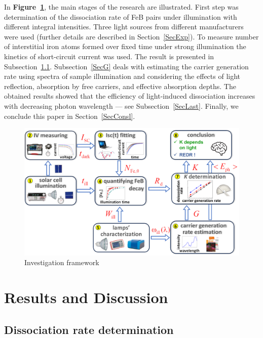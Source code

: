 \documentclass{WileyMSP-template}
\begin{document}
In \textbf{Figure~\ref{fig1}}, the main stages of the research are illustrated.
First step was determination of the dissociation rate of FeB pairs under illumination with different integral intensities.
Three light sources from different manufacturers were used (further details are described in Section~\ref{SecExp}).
To measure number of interstitial iron atoms formed over fixed time under strong illumination the kinetics of short-circuit current was used.
The result is presented in Subsection~\ref{SecR}.
Subsection~\ref{SecG} deals with estimating the carrier generation rate using spectra of sample illumination and considering the effects of light reflection,
absorption by free carriers, and effective absorption depths.
The obtained results showed that the efficiency of light-induced dissociation increases with decreasing photon wavelength --- see Subsection~\ref{SecLast}.
Finally, we conclude this paper in Section~\ref{SecConsl}.

\begin{figure}
\centering
  \includegraphics[width=0.5\linewidth]{Fig1.png}
  \caption{Investigation framework}
  \label{fig1}
\end{figure}



\section{Results and Discussion}

\subsection{Dissociation rate determination}\label{SecR}
\end{document}
